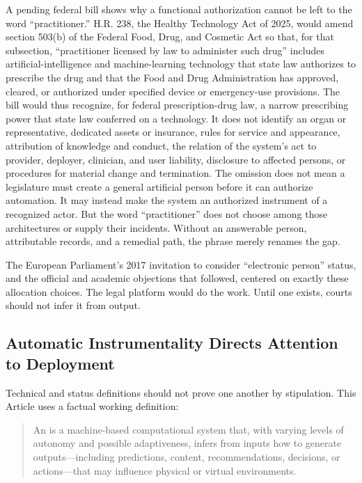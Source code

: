A pending federal bill shows why a functional authorization cannot be left to the word ``practitioner.'' H.R. 238, the Healthy Technology Act of 2025, would amend section 503(b) of the Federal Food, Drug, and Cosmetic Act so that, for that subsection, ``practitioner licensed by law to administer such drug'' includes artificial-intelligence and machine-learning technology that state law authorizes to prescribe the drug and that the Food and Drug Administration has approved, cleared, or authorized under specified device or emergency-use provisions. The bill would thus recognize, for federal prescription-drug law, a narrow prescribing power that state law conferred on a technology. It does not identify an organ or representative, dedicated assets or insurance, rules for service and appearance, attribution of knowledge and conduct, the relation of the system's act to provider, deployer, clinician, and user liability, disclosure to affected persons, or procedures for material change and termination. The omission does not mean a legislature must create a general artificial person before it can authorize automation. It may instead make the system an authorized instrument of a recognized actor. But the word ``practitioner'' does not choose among those architectures or supply their incidents. Without an answerable person, attributable records, and a remedial path, the phrase merely renames the gap.

The European Parliament's 2017 invitation to consider ``electronic person'' status, and the official and academic objections that followed, centered on exactly these allocation choices. The legal platform would do the work. Until one exists, courts should not infer it from output.

\subsection{Automatic Instrumentality Directs Attention to Deployment}

Technical and status definitions should not prove one another by stipulation. This Article uses a factual working definition:

\begin{quote}
An  is a machine-based computational system that, with varying levels of autonomy and possible adaptiveness, infers from inputs how to generate outputs---including predictions, content, recommendations, decisions, or actions---that may influence physical or virtual environments.
\end{quote}

